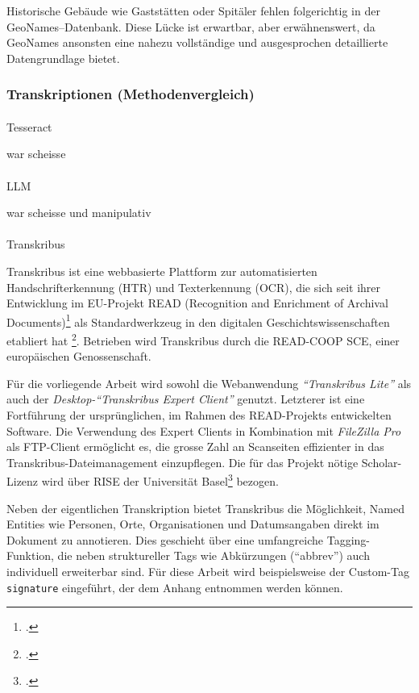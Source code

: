 \documentclass[12pt, a4paper, ngerman, bidi=default]{article}
\makeatletter
\let\cite\footcite
\let\oldparagraph\paragraph%
\renewcommand{\paragraph}{
    \@ifstar%
      \xxxParagraphStar%
      \xxxParagraphNoStar%
 }
\newcommand{\xxxParagraphStar}[1]{\oldparagraph*{#1}\mbox{}}
\newcommand{\xxxParagraphNoStar}[1]{\oldparagraph{#1}\mbox{}}
\makeatother
\begin{document}
Historische Gebäude wie Gaststätten oder Spitäler fehlen folgerichtig in der GeoNames–Datenbank. Diese Lücke ist erwartbar, aber erwähnenswert, da GeoNames 
ansonsten eine nahezu vollständige und ausgesprochen detaillierte Datengrundlage bietet.

\subsubsection{Transkriptionen (Methodenvergleich)}\label{section:Transkriptionen_Methoden}
\paragraph{Tesseract}

war scheisse

\paragraph{LLM}

war scheisse und manipulativ

\paragraph{Transkribus}

Transkribus ist eine webbasierte Plattform zur automatisierten Handschrifterkennung (HTR) und Texterkennung (OCR), die sich seit ihrer Entwicklung im EU-Projekt READ (Recognition and Enrichment of Archival Documents)\cite[vgl.][]{noauthor_recognition_nodate} als Standardwerkzeug in den digitalen Geschichtswissenschaften etabliert hat \cite[vgl.][postnote]{muhlberger_transkribus_2019}. Betrieben wird Transkribus durch die READ-COOP SCE, einer europäischen Genossenschaft.

Für die vorliegende Arbeit wird sowohl die Webanwendung \textit{\enquote{Transkribus Lite}} als auch der \textit{Desktop-\enquote{Transkribus Expert Client}} genutzt. Letzterer ist eine Fortführung der ursprünglichen, im Rahmen des READ-Projekts entwickelten Software. Die Verwendung des Expert Clients in Kombination mit \textit{FileZilla Pro} als FTP-Client ermöglicht es, die grosse Zahl an Scanseiten effizienter in das Transkribus-Dateimanagement einzupflegen. Die für das Projekt nötige Scholar-Lizenz wird über RISE der Universität Basel\cite[weitere Informationen:][postnote]{decker_home_nodate} bezogen.

Neben der eigentlichen Transkription bietet Transkribus die Möglichkeit, Named Entities wie Personen, Orte, Organisationen und Datumsangaben direkt im Dokument zu annotieren. Dies geschieht über eine umfangreiche Tagging-Funktion, die neben struktureller Tags wie Abkürzungen (\enquote{abbrev}) auch individuell erweiterbar sind. Für diese Arbeit wird beispielsweise der Custom-Tag \colorbox{signature}{\texttt{signature}} eingeführt, der dem Anhang entnommen werden können.
\end{document}
